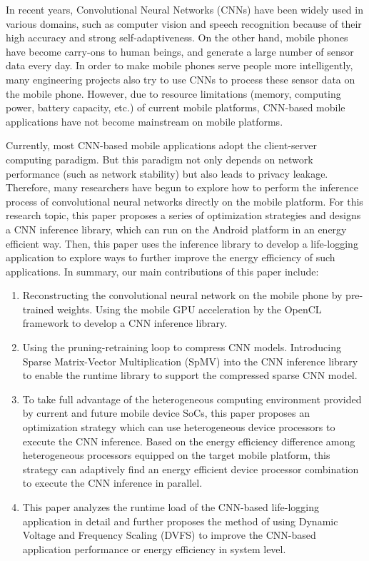 \cleardoublepage

\begin{enabstract}
In recent years, Convolutional Neural Networks (CNNs) have been widely used in various domains, such as computer vision and speech recognition because of their high accuracy and strong self-adaptiveness. On the other hand, mobile phones have become carry-ons to human beings, and generate a large number of sensor data every day. In order to make mobile phones serve people more intelligently, many engineering projects also try to use CNNs to process these sensor data on the mobile phone. However, due to resource limitations (memory, computing power, battery capacity, etc.) of current mobile platforms, CNN-based mobile applications have not become mainstream on mobile platforms.

Currently, most CNN-based mobile applications adopt the client-server computing paradigm. But this paradigm not only depends on network performance (such as network stability) but also leads to privacy leakage. Therefore, many researchers have begun to explore how to perform the inference process of convolutional neural networks directly on the mobile platform. For this research topic, this paper proposes a series of optimization strategies and designs a CNN inference library, which can run on the Android platform in an energy efficient way. Then, this paper uses the inference library to develop a life-logging application to explore ways to further improve the energy efficiency of such applications. In summary, our main contributions of this paper include:

\begin{enumerate}
  \item Reconstructing the convolutional neural network on the mobile phone by pre-trained weights. Using the mobile GPU acceleration by the OpenCL framework to develop a CNN inference library.
  \item Using the pruning-retraining loop to compress CNN models. Introducing Sparse Matrix-Vector Multiplication (SpMV) into the CNN inference library to enable the runtime library to support the compressed sparse CNN model.
  \item To take full advantage of the heterogeneous computing environment provided by current and future mobile device SoCs, this paper proposes an optimization strategy which can use heterogeneous device processors to execute the CNN inference. Based on the energy efficiency difference among heterogeneous processors equipped on the target mobile platform, this strategy can adaptively find an energy efficient device processor combination to execute the CNN inference in parallel.
  \item This paper analyzes the runtime load of the CNN-based life-logging application in detail and further proposes the method of using Dynamic Voltage and Frequency Scaling (DVFS) to improve the CNN-based application performance or energy efficiency in system level.
\end{enumerate}


\end{enabstract}
